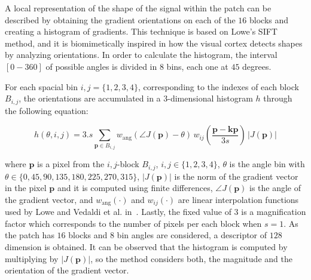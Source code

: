 \documentclass[utf8]{frontiersSCNS} %
\begin{document}
A local representation of the shape of the signal within the patch can be described by obtaining the gradient orientations on each of the $16$ blocks and creating a histogram of gradients.  This technique is based on Lowe's SIFT~\citep{Lowe2004} method, and it is biomimetically inspired in how the visual cortex detects shapes by analyzing orientations.   In order to calculate the histogram, the interval $[0-360]$ of possible angles is divided in $8$ bins, each one at $45$ degrees.

 For each spacial bin $ i,j = \{1,2,3,4\} $, corresponding to the indexes of each block $B_{i,j}$,  the orientations are accumulated in a  $3$-dimensional histogram $h$ through the following equation: 
 

\begin{equation}
 h(\theta,i,j) = 3.s \sum_{\mathbf{p} \in B_{i,j}} w_\mathrm{ang}(\angle J(\mathbf{p}) - \theta)\, w_{ij}\left(\frac{\mathbf{p} - \mathbf{kp}}{3 s}\right)\, |J(\mathbf{p})|
\label{eq:histogram}
\end{equation}

\noindent  where $\mathbf{p}$ is a pixel from  the $i,j$-block $B_{i,j}$, $ i,j \in \{1,2,3,4\} $,  $\theta$ is the angle bin with $ \theta \in \{0, 45, 90, 135, 180, 225, 270, 315\} $,  $ |J(\mathbf{p})| $ is the norm of the gradient vector in the pixel $\mathbf{p}$ and it is computed using finite differences, $\angle J(\mathbf{p}) $ is the angle of the gradient vector, and $ w_\mathrm{ang}(\cdot) $  and $ w_{ij}(\cdot) $ are linear interpolation functions used by Lowe and Vedaldi et al. in~\citep{Lowe2004,Vedaldi2010}.  Lastly, the fixed value of $ 3 $ is a magnification factor which corresponds to the number of pixels per each block when $s = 1$.  As the patch has  $16$ blocks and  $8$ bin angles are considered, a descriptor of $128$ dimension is obtained. It can be observed that the histogram is computed by multiplying by $ |J(\mathbf{p})| $, so the method considers both, the magnitude and the orientation of the gradient vector. 

%
\end{document}
